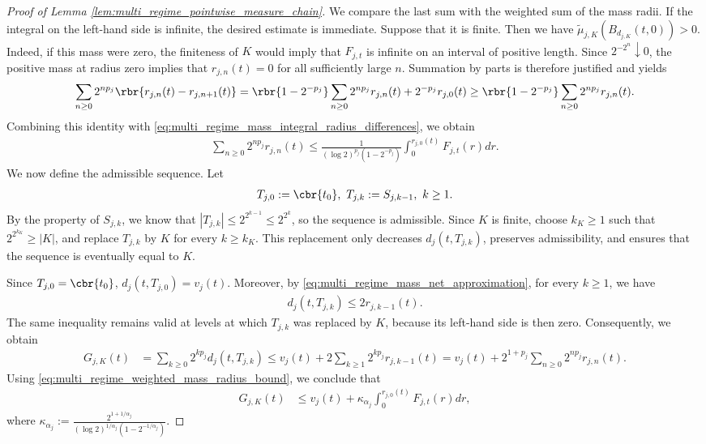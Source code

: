 \documentclass[11pt]{article}
\begin{document}
\begin{proof}[Proof of Lemma
\ref{lem:multi_regime_pointwise_measure_chain}]
We compare the last sum with the weighted sum of the mass radii. If the
integral on the left-hand side is infinite, the desired estimate is
immediate. Suppose that it is finite. Then we have $\widetilde\mu_{j,K}(B_{d_{j,K}}(t,0))>0$.
Indeed, if this mass were zero, the finiteness of $K$ would imply that
$F_{j,t}$ is infinite on an interval of positive length. Since
$2^{-2^n}\downarrow0$, the positive mass at radius zero implies that
$r_{j,n}(t)=0$ for all sufficiently large $n$. Summation by parts is
therefore justified and yields
\begin{align*}
\sum_{n\ge0}2^{np_j}
\rbr{r_{j,n}(t)-r_{j,n+1}(t)}=
\rbr{1-2^{-p_j}}
\sum_{n\ge0}2^{np_j}r_{j,n}(t)
+
2^{-p_j}r_{j,0}(t)\ge
\rbr{1-2^{-p_j}}
\sum_{n\ge0}2^{np_j}r_{j,n}(t).
\end{align*}
Combining this identity with
\eqref{eq:multi_regime_mass_integral_radius_differences}, we obtain
\begin{align}
\sum_{n\ge0}2^{np_j}r_{j,n}(t)
\le
\frac{1}{
(\log2)^{p_j}(1-2^{-p_j})
}
\int_0^{r_{j,0}(t)}F_{j,t}(r)dr.
\label{eq:multi_regime_weighted_mass_radius_bound}
\end{align}
We now define the admissible sequence. Let 
\begin{align*}
T_{j,0}:=\cbr{t_0},
\ 
T_{j,k}:=S_{j,k-1},
\ k\ge1.
\end{align*}
By the property of $S_{j,k}$, we know that $|T_{j,k}|\le
2^{2^{k-1}}\le
2^{2^k}$,
so the sequence is admissible. Since $K$ is finite, choose
$k_K\ge1$ such that $2^{2^{k_K}}\ge|K|$, and replace $T_{j,k}$ by
$K$ for every $k\ge k_K$. This replacement only decreases
$d_j(t,T_{j,k})$, preserves admissibility, and ensures that the
sequence is eventually equal to $K$.

Since $T_{j,0}=\cbr{t_0}$,  $d_j(t,T_{j,0})
=
v_j(t)$. Moreover, by \eqref{eq:multi_regime_mass_net_approximation}, for every
$k\ge1$, we have
\begin{align*}
d_j(t,T_{j,k})
\le
2r_{j,k-1}(t).
\end{align*}
The same inequality remains valid at levels at which $T_{j,k}$ was
replaced by $K$, because its left-hand side is then zero. Consequently, we obtain
\begin{align*}
G_{j,K}(t)
&=
\sum_{k\ge0}2^{kp_j}d_j(t,T_{j,k})\le
v_j(t)
+
2\sum_{k\ge1}2^{kp_j}r_{j,k-1}(t)=
v_j(t)
+
2^{1+p_j}
\sum_{n\ge0}2^{np_j}r_{j,n}(t).
\end{align*}
Using \eqref{eq:multi_regime_weighted_mass_radius_bound}, we conclude
that
\begin{align}
G_{j,K}(t)
&\le
v_j(t)
+
\kappa_{\alpha_j}
\int_0^{r_{j,0}(t)}F_{j,t}(r)dr,
\label{eq:multi_regime_chain_cost_restricted_integral}
\end{align}
where $\kappa_{\alpha_j}
:=
\frac{2^{1+1/\alpha_j}}{
(\log2)^{1/\alpha_j}(1-2^{-1/\alpha_j})
}$.


\end{proof}
\end{document}
